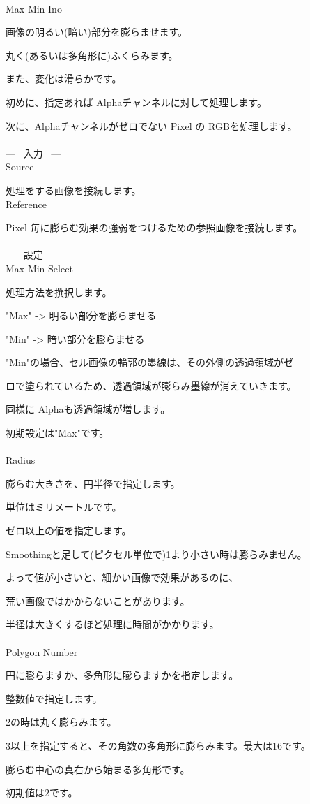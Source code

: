 \documentclass[a4paper,12pt]{article}
\begin{document}
\thispagestyle{empty}

\Large
\noindent \\
Max Min Ino\medskip
\par
\normalsize
画像の明るい(暗い)部分を膨らませます。\\
\par
丸く(あるいは多角形に)ふくらみます。\par
また、変化は滑らかです。\\
\par
初めに、指定あれば Alphaチャンネルに対して処理します。\par
次に、Alphaチャンネルがゼロでない Pixel の RGBを処理します。\\
\\
--- \ 入力 \ ---\\
Source\par
処理をする画像を接続します。\\
Reference\par
Pixel 毎に膨らむ効果の強弱をつけるための参照画像を接続します。\\
\\
--- \ 設定 \ ---\\
Max Min Select\par
処理方法を撰択します。\par
"Max" -> 明るい部分を膨らませる\par
"Min" -> 暗い部分を膨らませる\par
"Min"の場合、セル画像の輪郭の墨線は、その外側の透過領域がゼ\par
ロで塗られているため、透過領域が膨らみ墨線が消えていきます。\par
同様に Alphaも透過領域が増します。\par
初期設定は"Max"です。\\
\\
Radius\par
膨らむ大きさを、円半径で指定します。\par
単位はミリメートルです。\par
ゼロ以上の値を指定します。\par
Smoothingと足して(ピクセル単位で)1より小さい時は膨らみません。\par
よって値が小さいと、細かい画像で効果があるのに、\par
荒い画像ではかからないことがあります。\par
半径は大きくするほど処理に時間がかかります。\\
\\
Polygon Number\par
円に膨らますか、多角形に膨らますかを指定します。\par
整数値で指定します。\par
2の時は丸く膨らみます。\par
3以上を指定すると、その角数の多角形に膨らみます。最大は16です。\par
膨らむ中心の真右から始まる多角形です。\par
初期値は2です。
\end{document}
